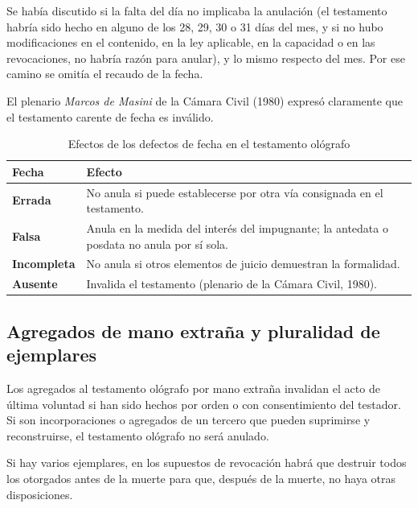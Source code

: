 \documentclass[12pt,oneside]{book}
\begin{document}
Se había discutido si la falta del día no implicaba la anulación (el testamento habría sido hecho en alguno de los 28, 29, 30 o 31 días del mes, y si no hubo modificaciones en el contenido, en la ley aplicable, en la capacidad o en las revocaciones, no habría razón para anular), y lo mismo respecto del mes. Por ese camino se omitía el recaudo de la fecha.

\begin{important}
El plenario \emph{Marcos de Masini} de la Cámara Civil (1980) expresó claramente que el testamento carente de fecha es inválido.
\end{important}

\begin{table}[H]
\centering
\caption{Efectos de los defectos de fecha en el testamento ológrafo}
\small
\begin{tabularx}{\textwidth}{@{}>{\raggedright\arraybackslash}p{2.6cm}>{\raggedright\arraybackslash}X@{}}
\toprule
\textbf{Fecha} & \textbf{Efecto} \\
\midrule
\textbf{Errada} & No anula si puede establecerse por otra vía consignada en el testamento. \\
\textbf{Falsa} & Anula en la medida del interés del impugnante; la antedata o posdata no anula por sí sola. \\
\textbf{Incompleta} & No anula si otros elementos de juicio demuestran la formalidad. \\
\textbf{Ausente} & Invalida el testamento (plenario de la Cámara Civil, 1980). \\
\bottomrule
\end{tabularx}
\end{table}

\subsection{Agregados de mano extraña y pluralidad de ejemplares}

Los agregados al testamento ológrafo por mano extraña invalidan el acto de última voluntad si han sido hechos por orden o con consentimiento del testador. Si son incorporaciones o agregados de un tercero que pueden suprimirse y reconstruirse, el testamento ológrafo no será anulado.

Si hay varios ejemplares, en los supuestos de revocación habrá que destruir todos los otorgados antes de la muerte para que, después de la muerte, no haya otras disposiciones.

\end{document}
